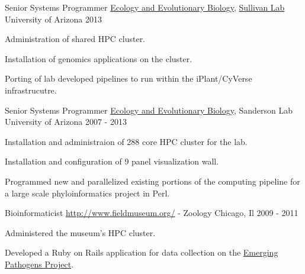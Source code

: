 \begin{cventries}
  \cventry
    {Senior Systems Programmer} %
    {\href{http://eeb.arizona.edu/}{Ecology and Evolutionary Biology}, \href{https://u.osu.edu/viruslab/}{Sullivan Lab}} %
    {University of Arizona} %
    {2013} %
    {
      \begin{cvitems} %
        \item {Administration of shared HPC cluster.}
        \item {Installation of genomics applications on the cluster.}
        \item {Porting of lab developed pipelines to run within the iPlant/CyVerse infrastrucutre.}
      \end{cvitems}
    }

  \cventry
    {Senior Systems Programmer} %
    {\href{http://eeb.arizona.edu/}{Ecology and Evolutionary Biology}, Sanderson Lab} %
    {University of Arizona} %
    {2007 - 2013} %
    {
      \begin{cvitems} %
        \item {Installation and administraion of 288 core HPC cluster for the lab.}
        \item {Installation and configuration of 9 panel visualization wall.}
        \item {Programmed new and parallelized existing portions of the computing pipeline for a large scale phyloinformatics project in Perl.}
      \end{cvitems}
    }

  \cventry
    {Bioinformaticist} %
    {\href{The Field Museum}{http://www.fieldmuseum.org/} - Zoology} %
    {Chicago, Il} %
    {2009 - 2011} %
    {
      \begin{cvitems} %
        \item {Administered the museum's HPC cluster.}
        \item {Developed a Ruby on Rails application for data collection on the \href{https://www.fieldmuseum.org/emerging-pathogens-project}{Emerging Pathogens Project}.}
      \end{cvitems}
    }


\end{cventries}
